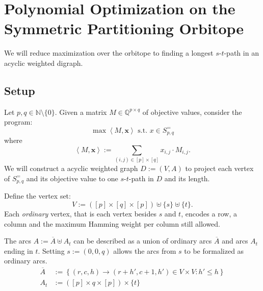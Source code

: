 \documentclass[a4paper]{amsart}
\theoremstyle{definition}
\theoremstyle{remark}
\begin{document}


\section{Polynomial Optimization on the  Symmetric Partitioning
  Orbitope}
\label{fluss}
We will reduce maximization over the orbitope to finding a longest
\(s\)-\(t\)-path in an acyclic weighted digraph.

\subsection{Setup}

Let \(p, q \in \mathbb{N} \setminus \{0\}\).  Given a matrix \(M \in
\mathbb{Q}^{p \times q}\) of objective values, consider the program:
\begin{equation}
\label{optS}
\max \left<M, \mathbf{x} \right>  \text{ s.t. } x \in S^=_{p, q}
\end{equation}
where \[\left<M, \mathbf{x} \right> := \sum_{(i, j)\in [p]\times [q]} x_{i, j}\cdot M_{i, j}\text{.}\]
We will construct a acyclic weighted graph \(D := (V, A)\) to project each vertex of
\(S^=_{p, q}\) and its objective value to one \(s\)-\(t\)-path in \(D\) and its length.

Define the vertex set:
\[V := \left( [p]\times [q] \times [p]\right) \uplus \{s\} \uplus \{t\}\text{.}\] 
Each \textit{ordinary} vertex, that is
each vertex besides \(s\) and \(t\), encodes a row, a column and the
maximum Hamming weight per column still allowed.

The arcs \(A := \overline{A} \uplus A_t\) can be described as a union
of ordinary arcs \(\overline{A}\) and arcs \(A_t\) ending in \(t\).  Setting
\(s:=(0, 0, q)\) allows the arcs from $s$ to be formalized as
ordinary arcs.
\begin{align}
  \overline{A} &:=
  \left\{ \left(r, c, h\right) \rightarrow \left(r+h', c+1, h'\right) \in V \times V \colon
  h' \leq h \right\} \\
  A_t &:= ([p] \times {q} \times [p]) \times \{t\}
\end{align}
\end{document}
